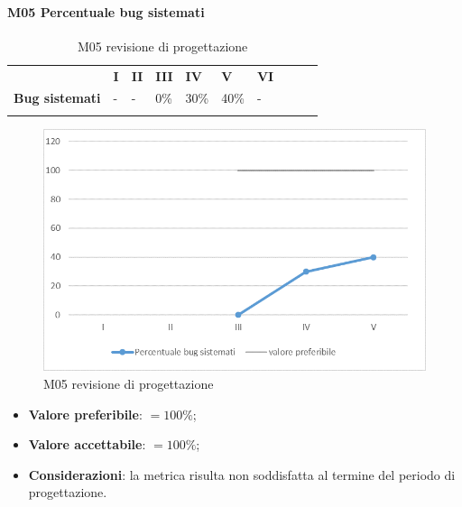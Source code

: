 \paragraph{M05 Percentuale bug sistemati} \mbox{}
\begin{longtable}[H!] {						
		>{}p{50mm}  		
		>{}p{8mm}
		>{}p{8mm}		
		>{}p{8mm}		
		>{}p{8mm}		
		>{}p{8mm}		
		>{}p{8mm}
		>{}p{8mm}
		>{}p{8mm}
		>{}p{8mm}
	}
	\rowcolor{gray!50}
	\textbf{} & \textbf{I} & \textbf{II} & \textbf{III} & \textbf{IV} & \textbf{V} & \textbf{VI} \TBstrut \\ [2mm]
	\textbf{Bug sistemati} & - & - & 0\% & 30\% & 40\% & - \TBstrut \\ [2mm]
	\rowcolor{white}
	\caption{M05 revisione di progettazione}
\end{longtable}
\begin{figure}[H] 	
\includegraphics[width=\linewidth]{./img/grafici/RP16.png}	
\caption{M05 revisione di progettazione}	
\end{figure}
\begin{itemize}
	\item \textbf{Valore preferibile}: $=100\%$;
	\item \textbf{Valore accettabile}: $=100\%$;
	\item \textbf{Considerazioni}: la metrica risulta non soddisfatta al termine del periodo di progettazione.
\end{itemize}
